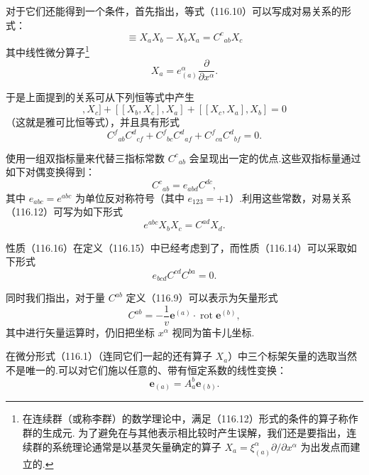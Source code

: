对于它们还能得到一个条件，首先指出，等式（116.10）可以写成对易关系的形式：
\begin{equation}
  [X_{a},X_{b}]\equiv X_{a}X_{b}-X_{b}X_{a}=C^{c}{}_{ab}X_{c}
\end{equation}
其中线性微分算子\footnote{在连续群（或称李群）的数学理论中，满足（116.12）形式的条件的算子称作群的生成元. 为了避免在与其他表示相比较时产生误解，我们还是要指出，连续群的系统理论通常是以基灵矢量确定的算子 $X_{a}=\xi_{(a)}^{\alpha}\partial/\partial x^{\alpha}$ 为出发点而建立的.}
\begin{equation}
  X_{a}=e_{(a)}^{\alpha}\frac{\partial}{\partial x^{\alpha}}.
\end{equation}

于是上面提到的关系可从下列恒等式中产生
\begin{equation*}
  [[X_{a},X_{b}],X_{c}]+[[X_{b},X_{c}],X_{a}]
  +[[X_{c},X_{a}],X_{b}]=0
\end{equation*}
（这就是雅可比恒等式），并且具有形式
\begin{equation}
  C^{f}{}_{ab}C^{d}{}_{cf}
  +C^{f}{}_{bc}C^{d}{}_{af}
  +C^{f}{}_{ca}C^{d}{}_{bf}=0.
\end{equation}

使用一组双指标量来代替三指标常数 $C^{c}{}_{ab}$ 会呈现出一定的优点.这些双指标量通过如下对偶变换得到：
\begin{equation}
  C^{c}{}_{ab}=e_{abd}C^{dc},
\end{equation}
其中 $e_{abc}=e^{abc}$ 为单位反对称符号（其中 $e_{123}=+1$）.利用这些常数，对易关系（116.12）可写为如下形式
\begin{equation}
  e^{abc}X_{b}X_{c}=C^{ad}X_{d}.
\end{equation}

性质（116.16）在定义（116.15）中已经考虑到了，而性质（116.14）可以采取如下形式
\begin{equation}
  e_{bcd}C^{cd}C^{ba}=0.
\end{equation}

同时我们指出，对于量 $C^{ab}$ 定义（116.9）可以表示为矢量形式
\begin{equation}
  C^{ab}=-\frac{1}{v}\boldsymbol{e}^{(a)}\cdot
  \operatorname{rot}\boldsymbol{e}^{(b)},
\end{equation}
其中进行矢量运算时，仍旧把坐标 $x^{\alpha}$ 视同为笛卡儿坐标.

在微分形式（116.1）（连同它们一起的还有算子 $X_{a}$）中三个标架矢量的选取当然不是唯一的.可以对它们施以任意的、带有恒定系数的线性变换：
\begin{equation}
  \boldsymbol{e}_{(a)}=A_{a}^{b}\boldsymbol{e}_{(b)}.
\end{equation}

